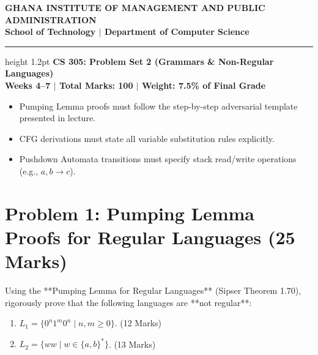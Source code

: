 \documentclass[11pt,a4paper]{article}
\begin{document}
\begin{center}
    {\Large \textbf{\color{gimpanavy}GHANA INSTITUTE OF MANAGEMENT AND PUBLIC ADMINISTRATION}}\\
    {\large \textbf{\color{gimpaaccent}School of Technology $|$ Department of Computer Science}}\\
    \vspace{4pt}
    \hrule height 1.2pt \color{gimpanavy}
    \vspace{6pt}
    {\LARGE \textbf{\color{gimpanavy}CS 305: Problem Set 2 (Grammars \& Non-Regular Languages)}}\\
    {\large \textbf{Weeks 4--7 $|$ Total Marks: 100 $|$ Weight: 7.5\% of Final Grade}}
\end{center}

\vspace{6pt}

\begin{tcolorbox}[colback=gimpalight, colframe=gimpanavy, title=\textbf{Instructions \& Guidelines}]
\begin{itemize}[leftmargin=1.2em, itemsep=2pt]
    \item Pumping Lemma proofs must follow the step-by-step adversarial template presented in lecture.
    \item CFG derivations must state all variable substitution rules explicitly.
    \item Pushdown Automata transitions must specify stack read/write operations (e.g., $a, b \to c$).
\end{itemize}
\end{tcolorbox}

\vspace{8pt}

\section*{Problem 1: Pumping Lemma Proofs for Regular Languages (25 Marks)}
Using the **Pumping Lemma for Regular Languages** (Sipser Theorem 1.70), rigorously prove that the following languages are **not regular**:
\begin{enumerate}[label=\textbf{(\alph*)}]
    \item $L_1 = \{0^n 1^m 0^n \mid n, m \ge 0\}$. (12 Marks)
    \item $L_2 = \{w w \mid w \in \{a, b\}^*\}$. (13 Marks)
\end{enumerate}

\vspace{8pt}
\end{document}
